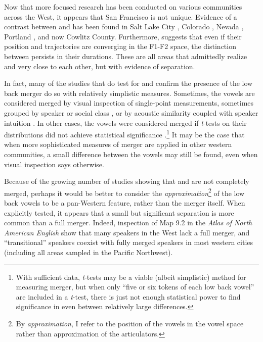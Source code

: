 Now that more focused research has been conducted on various communities across the West, it appears that San Francisco is not unique. Evidence of a contrast between \lot and \thought has been found in Salt Lake City \citep{dipaolo_1992}, Colorado \citep{holland_brandenburg_2017_pads}, Nevada \citep{fridland_kendall_2017_pads}, Portland \citep{becker_etal_2016_pads}, and now Cowlitz County. Furthermore, \citet{brickhouse_2019} suggests that even if their position and trajectories are converging in the F1-F2 space, the distinction between persists in their durations. These are all areas that admittedly realize \lot and \thought very close to each other, but with evidence of separation.

In fact, many of the studies that do test for and confirm the presence of the low back merger do so with relatively simplistic measures. Sometimes, the vowels are considered merged by visual inspection of single-point measurements, sometimes grouped by speaker or social class \citep{brumbaugh_koops_2017_pads, kennedy_grama_2012, wassink_2015}, or by acoustic similarity coupled with speaker intuition \citep[59]{labov_ash_boberg_2006_anae}. In other cases, the vowels were considered merged if \textit{t}-tests on their distributions did not achieve statistical significance \citep{bar_el_etal_2017}.\footnote{With sufficient data, \textit{t}-tests may be a viable (albeit simplistic) method for measuring merger, but when only ``five or six tokens of each low back vowel'' \citep[122]{bar_el_etal_2017} are included in a \textit{t}-test, there is just not enough statistical power to find significance in even between relatively large differences.} It may be the case that when more sophisticated measures of merger are applied in other western communities, a small difference between the vowels may still be found, even when visual inspection says otherwise.

Because of the growing number of studies showing that \lot and \thought are not completely merged, perhaps it would be better to consider the \textit{approximation}\footnote{By \textit{approximation}, I refer to the position of the vowels in the vowel space rather than approximation of the articulators.} of the low back vowels to be a pan-Western feature, rather than the merger itself. When explicitly tested, it appears that a small but significant separation is more common than a full merger. Indeed, inspection of Map 9.2 in the \textit{Atlas of North American English} show that many speakers in the West lack a full merger, and ``transitional'' speakers coexist with fully merged speakers in most western cities (including all areas sampled in the Pacific Northwest).

